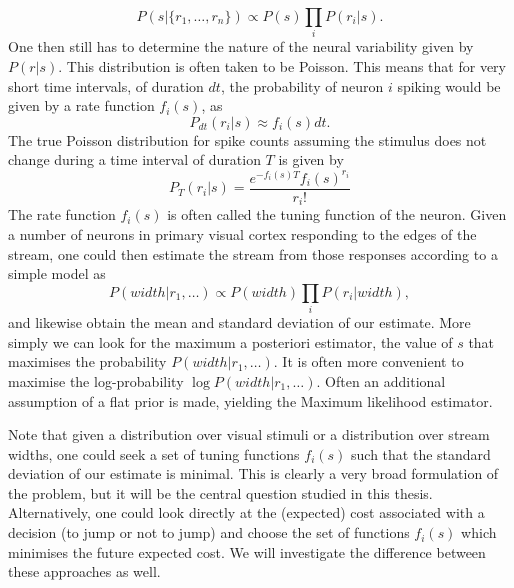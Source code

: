 \[
P(s|\{r_1,\ldots,r_n\}) \propto P(s) \prod_i P(r_i|s).
\]
One then still has to determine the nature of the neural variability given by $P(r|s)$. This distribution is often taken to be Poisson. This means that for very short time intervals, of duration $dt$, the probability of neuron $i$ spiking would be given by a rate function $f_i(s)$, as
\[
P_{dt}(r_i|s) \approx f_i(s) dt.
\]
The true Poisson distribution for spike counts assuming the stimulus does not change during a time interval of duration $T$ is given by
\[
P_T(r_i|s) = \frac{e^{-f_i(s) T}f_i(s)^{r_i}}{r_i!}
\]
The rate function $f_i(s)$ is often called the tuning function of the neuron. Given a number of neurons in primary visual cortex responding to the edges of the stream, one could then estimate the stream from those responses according to a simple model as
\[
P(width|{r_1,\ldots}) \propto P(width) \prod_i P(r_i|width),
\]
and likewise obtain the mean and standard deviation of our estimate. More simply we can look for the maximum a posteriori estimator, the value of $s$ that maximises
the probability $P(width|{r_1,\ldots})$. It is often more convenient to maximise the log-probability $\log P(width|{r_1,\ldots})$. Often an additional assumption of a flat
prior is made, yielding the Maximum likelihood estimator.
\par
Note that given a distribution over visual stimuli or a distribution over stream widths, one could seek a set of tuning functions $f_i(s)$ such that the standard deviation 
of our estimate is minimal. This is clearly a very broad formulation of the problem, but it will be the central question studied in this thesis. Alternatively, one could look
directly at the (expected) cost associated with a decision (to jump or not to jump) and choose the set of functions $f_i(s)$ which minimises the future expected cost.
We will investigate the difference between these approaches as well.
\par

